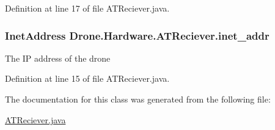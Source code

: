 Definition at line 17 of file A\+T\+Reciever.\+java.

\hypertarget{class_drone_1_1_hardware_1_1_a_t_reciever_a5253dfd32652a64fba8f0f2d00530866}{}
\subsubsection[{inet\+\_\+addr}]{\setlength{\rightskip}{0pt plus 5cm}Inet\+Address Drone.\+Hardware.\+A\+T\+Reciever.\+inet\+\_\+addr\hspace{0.3cm}{\ttfamily [private]}}\label{class_drone_1_1_hardware_1_1_a_t_reciever_a5253dfd32652a64fba8f0f2d00530866}
The I\+P address of the drone 

Definition at line 15 of file A\+T\+Reciever.\+java.



The documentation for this class was generated from the following file\+:\begin{DoxyCompactItemize}
\item 
\hyperlink{_a_t_reciever_8java}{A\+T\+Reciever.\+java}\end{DoxyCompactItemize}
